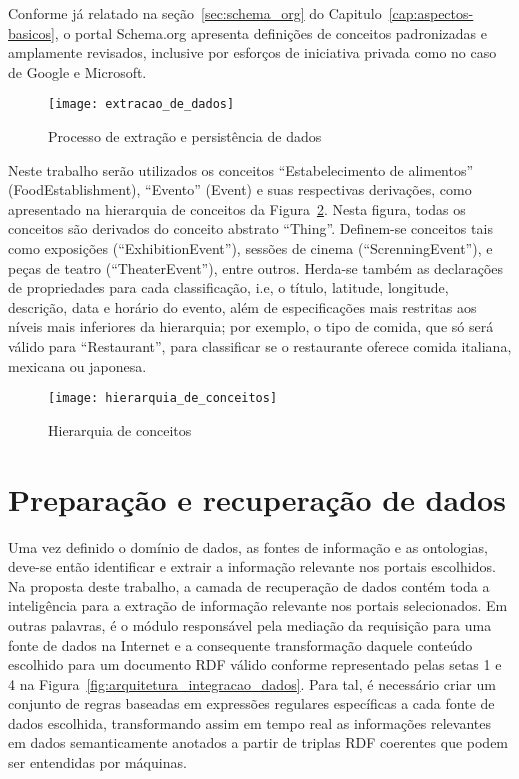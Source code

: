 Conforme já relatado na seção~\ref{sec:schema_org} do Capitulo~\ref{cap:aspectos-basicos}, o portal Schema.org \citep{Mika2015} apresenta definições de conceitos padronizadas e amplamente revisados, inclusive por esforços de iniciativa privada como no caso de Google e Microsoft.
    
\begin{figure}[!ht]
  \centering
  \texttt{[image: extracao\_de\_dados]} 
  \caption{Processo de extração e persistência de dados}
  \label{fig:extracao_de_dados} 
\end{figure}

Neste trabalho serão utilizados os conceitos ``Estabelecimento de alimentos'' (FoodEstablishment), ``Evento'' (Event) e suas respectivas derivações,  como apresentado na hierarquia de conceitos da Figura~\ref{fig:hierarquia_de_conceitos}. Nesta figura,   todas os conceitos são derivados do conceito abstrato  ``Thing''. Definem-se conceitos tais como  exposições (``ExhibitionEvent''), sessões de cinema (``ScrenningEvent''), e peças de teatro (``TheaterEvent''), entre outros.  Herda-se também as declarações de propriedades para cada classificação, i.e, o título, latitude, longitude, descrição, data e horário do evento, além de especificações mais restritas aos níveis mais inferiores da hierarquia;  por exemplo, o tipo de comida, que só será válido para ``Restaurant'', para classificar se o restaurante oferece comida italiana, mexicana ou japonesa.

\begin{figure}[!ht]
  \centering
  \texttt{[image: hierarquia\_de\_conceitos]} 
  \caption{Hierarquia de conceitos}
  \label{fig:hierarquia_de_conceitos} 
\end{figure}

\section{Preparação e recuperação de dados}
\label{sec:preparacao_recuperacao_dados}

Uma vez definido  o domínio de dados, as fontes de informação e as ontologias,  deve-se então  identificar e extrair a informação relevante nos portais escolhidos. Na proposta deste trabalho, a camada de recuperação de dados contém toda a inteligência para a extração de informação relevante nos portais selecionados. Em outras palavras, é o módulo responsável pela mediação da requisição para uma fonte de dados na Internet e a consequente transformação daquele conteúdo escolhido para um documento RDF válido conforme representado pelas setas 1 e 4 na Figura~\ref{fig:arquitetura_integracao_dados}. Para tal, é necessário criar  um conjunto de regras baseadas em expressões regulares específicas a cada fonte de dados escolhida, transformando assim em tempo real as informações relevantes em dados semanticamente anotados a partir de triplas RDF coerentes que podem ser entendidas por máquinas.

